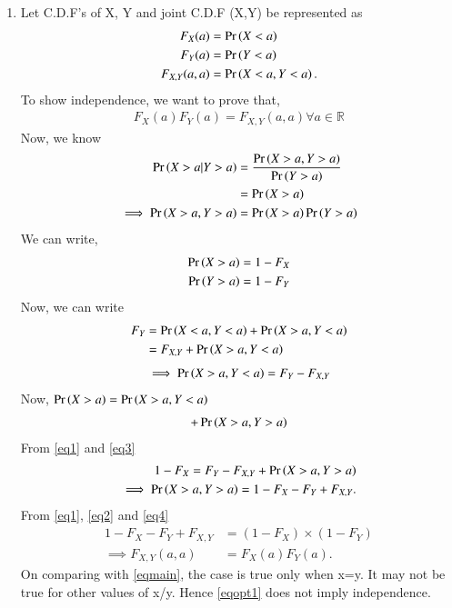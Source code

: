\documentclass[journal,12pt,twocolumn]{IEEEtran}
\begin{document}
\begin{enumerate}

\item Let C.D.F's of X, Y and joint C.D.F (X,Y) be represented as
\begin{align}
    F_X(a) &= \Pr\left(X < a\right)\\
    F_Y(a) &= \Pr\left(Y < a\right)\\
    F_{X,Y}(a,a) &= \Pr\left(X < a, Y < a\right).
\end{align}
To show independence, we want to prove that,
\begin{align}
    F_X(a)F_Y(a) = F_{X, Y}(a,a) \forall a \in \mathbb{R}
\end{align}
Now, we know
\begin{align}
    \Pr\left(X>a|Y>a\right) &= \frac{\Pr\left(X>a, Y>a\right)}{\Pr\left(Y>a\right)}\\
    &= \Pr\left(X>a\right)\\
    \implies \Pr\left(X>a, Y>a\right) &= \Pr\left(X>a\right) \Pr\left(Y>a\right)
\end{align}
We can write, 
\begin{align}
    \Pr\left(X>a\right) &= 1 - F_X\label{eq1}\\
    \Pr\left(Y>a\right) &= 1 - F_Y\label{eq2}
\end{align}
Now, we can write
\begin{align}
    F_Y &= \Pr\left(X<a, Y<a\right) + \Pr\left(X>a, Y<a\right)\\
    &= F_{X,Y} + \Pr\left(X>a, Y<a\right)
\end{align}
\begin{align}
\implies \Pr\left(X>a, Y<a\right) = F_Y - F_{X,Y}\label{eq3}
\end{align}
Now, 
\begin{math}
\Pr\left(X>a\right)=\Pr\left(X>a, Y<a\right)
\end{math}
\begin{align}
    +\Pr\left(X>a, Y>a\right)
\end{align}
From \eqref{eq1} and \eqref{eq3}
\begin{align}
    1 - F_X = F_Y - F_{X,Y} + \Pr\left(X>a, Y>a\right)\\
    \implies \Pr\left(X>a, Y>a\right) = 1 - F_X - F_Y + F_{X,Y}.\label{eq4}
\end{align}
From \eqref{eq1}, \eqref{eq2} and \eqref{eq4}
\begin{align}
    1 - F_X - F_Y + F_{X,Y} &= (1 - F_X) \times (1 - F_Y)\\
    \implies F_{X, Y}(a,a) &= F_X(a)F_Y(a).\label{eqopt1}
\end{align}
On comparing with \eqref{eqmain}, the case is true only when x=y. It may not be true for other values of x/y. Hence \eqref{eqopt1} does not imply independence.


\end{enumerate}
\end{document}
